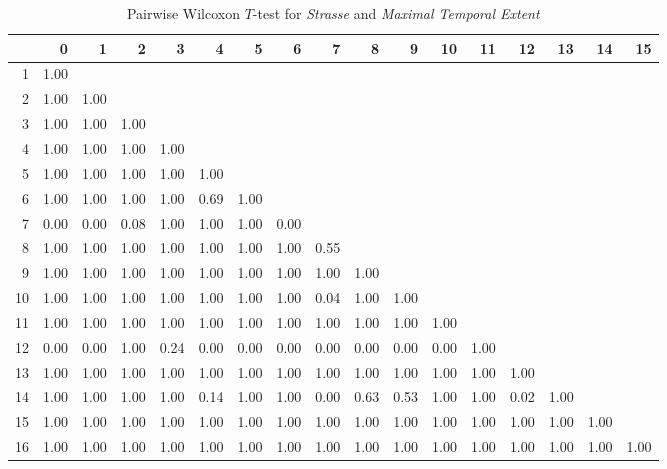 \begin{table}[ht!]
	\tiny
	\setlength{\tabcolsep}{4pt}
	\centering
  \begin{tabular}{rrrrrrrrrrrrrrrrr}
    \hline
   & 0 & 1 & 2 & 3 & 4 & 5 & 6 & 7 & 8 & 9 & 10 & 11 & 12 & 13 & 14 & 15 \\ 
    \hline
  1 & 1.00 &  &  &  &  &  &  &  &  &  &  &  &  &  &  &  \\ 
    2 & 1.00 & 1.00 &  &  &  &  &  &  &  &  &  &  &  &  &  &  \\ 
    3 & 1.00 & 1.00 & 1.00 &  &  &  &  &  &  &  &  &  &  &  &  &  \\ 
    4 & 1.00 & 1.00 & 1.00 & 1.00 &  &  &  &  &  &  &  &  &  &  &  &  \\ 
    5 & 1.00 & 1.00 & 1.00 & 1.00 & 1.00 &  &  &  &  &  &  &  &  &  &  &  \\ 
    6 & 1.00 & 1.00 & 1.00 & 1.00 & 0.69 & 1.00 &  &  &  &  &  &  &  &  &  &  \\ 
    7 & 0.00 & 0.00 & 0.08 & 1.00 & 1.00 & 1.00 & 0.00 &  &  &  &  &  &  &  &  &  \\ 
    8 & 1.00 & 1.00 & 1.00 & 1.00 & 1.00 & 1.00 & 1.00 & 0.55 &  &  &  &  &  &  &  &  \\ 
    9 & 1.00 & 1.00 & 1.00 & 1.00 & 1.00 & 1.00 & 1.00 & 1.00 & 1.00 &  &  &  &  &  &  &  \\ 
    10 & 1.00 & 1.00 & 1.00 & 1.00 & 1.00 & 1.00 & 1.00 & 0.04 & 1.00 & 1.00 &  &  &  &  &  &  \\ 
    11 & 1.00 & 1.00 & 1.00 & 1.00 & 1.00 & 1.00 & 1.00 & 1.00 & 1.00 & 1.00 & 1.00 &  &  &  &  &  \\ 
    12 & 0.00 & 0.00 & 1.00 & 0.24 & 0.00 & 0.00 & 0.00 & 0.00 & 0.00 & 0.00 & 0.00 & 1.00 &  &  &  &  \\ 
    13 & 1.00 & 1.00 & 1.00 & 1.00 & 1.00 & 1.00 & 1.00 & 1.00 & 1.00 & 1.00 & 1.00 & 1.00 & 1.00 &  &  &  \\ 
    14 & 1.00 & 1.00 & 1.00 & 1.00 & 0.14 & 1.00 & 1.00 & 0.00 & 0.63 & 0.53 & 1.00 & 1.00 & 0.02 & 1.00 &  &  \\ 
    15 & 1.00 & 1.00 & 1.00 & 1.00 & 1.00 & 1.00 & 1.00 & 1.00 & 1.00 & 1.00 & 1.00 & 1.00 & 1.00 & 1.00 & 1.00 &  \\ 
    16 & 1.00 & 1.00 & 1.00 & 1.00 & 1.00 & 1.00 & 1.00 & 1.00 & 1.00 & 1.00 & 1.00 & 1.00 & 1.00 & 1.00 & 1.00 & 1.00 \\ 
     \hline
  \end{tabular}
	\caption{Pairwise Wilcoxon $T$-test for \textit{Strasse} and \textit{Maximal Temporal Extent}}
	\label{tbl:wilcoxon_baysis_matched_Strasse_TMax}
\end{table}
